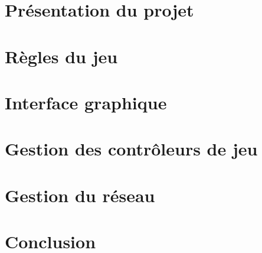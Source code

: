 \section*{Présentation du projet}


\newpage

\section{Règles du jeu}


\newpage

\section{Interface graphique}


\newpage

\section{Gestion des contrôleurs de jeu}


\newpage

\section{Gestion du réseau}


\newpage

\section*{Conclusion}
